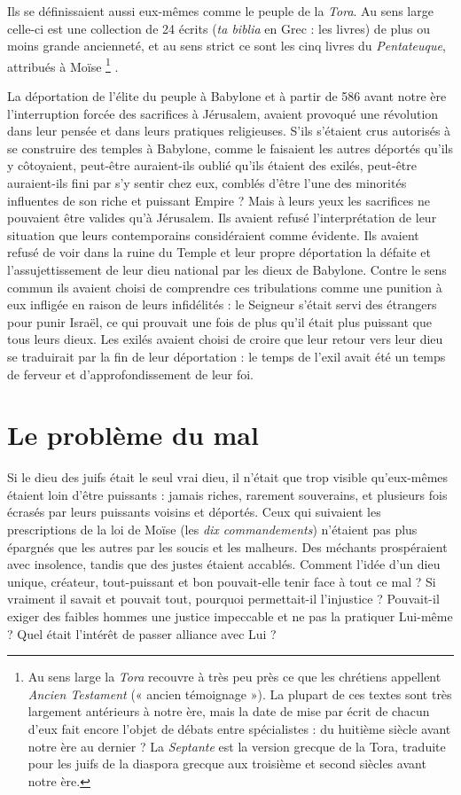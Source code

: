  Ils se définissaient aussi eux-mêmes comme le peuple de la \emph{Tora}. Au sens large celle-ci est une collection de 24 écrits (\emph{ta biblia} en Grec : les livres) de plus ou moins grande ancienneté, et au sens strict ce sont les cinq livres du \emph{Pentateuque}, attribués à Moïse%
\footnote{Au sens large la \emph{Tora} recouvre à très peu près ce que les chrétiens appellent \emph{Ancien Testament} (« ancien témoignage »). La plupart de ces textes sont très largement antérieurs à notre ère, mais la date de mise par écrit de chacun d'eux fait encore l'objet de débats entre spécialistes : du huitième siècle avant notre ère au dernier ? La \emph{Septante} est la version grecque de la Tora, traduite pour les juifs de la diaspora grecque aux troisième et second siècles avant notre ère.}%
.

 La déportation de l'élite du peuple à Babylone et à partir de 586 avant notre ère l'interruption forcée des sacrifices à Jérusalem, avaient provoqué une révolution dans leur pensée et dans leurs pratiques religieuses. S'ils s'étaient crus autorisés à se construire des temples à Babylone, comme le faisaient les autres déportés qu'ils y côtoyaient, peut-être auraient-ils oublié qu'ils étaient des exilés, peut-être auraient-ils fini par s'y sentir chez eux, comblés d'être l'une des minorités influentes de son riche et puissant Empire ? Mais à leurs yeux les sacrifices ne pouvaient être valides qu'à Jérusalem. Ils avaient refusé l'interprétation de leur situation que leurs contemporains considéraient comme évidente. Ils avaient refusé de voir dans la ruine du Temple et leur propre déportation la défaite et l'assujettissement de leur dieu national par les dieux de Babylone. Contre le sens commun ils avaient choisi de comprendre ces tribulations comme une punition à eux infligée en raison de leurs infidélités : le Seigneur s'était servi des étrangers pour punir Israël, ce qui prouvait une fois de plus qu'il était plus puissant que tous leurs dieux. Les exilés avaient choisi de croire que leur retour vers leur dieu se traduirait par la fin de leur déportation : le temps de l'exil avait été un temps de ferveur et d'approfondissement de leur foi. 

\section{Le problème du mal}

 Si le dieu des juifs était le seul vrai dieu, il n'était que trop visible qu'eux-mêmes étaient loin d'être puissants : jamais riches, rarement souverains, et plusieurs fois écrasés par leurs puissants voisins et déportés. Ceux qui suivaient les prescriptions de la loi de Moïse (les \emph{dix commandements}) n'étaient pas plus épargnés que les autres par les soucis et les malheurs. Des méchants prospéraient avec insolence, tandis que des justes étaient accablés. Comment l'idée d'un dieu unique, créateur, tout-puissant et bon pouvait-elle tenir face à tout ce mal ? Si vraiment il savait et pouvait tout, pourquoi permettait-il l'injustice ? Pouvait-il exiger des faibles hommes une justice impeccable et ne pas la pratiquer Lui-même ? Quel était l'intérêt de passer alliance avec Lui ? 

